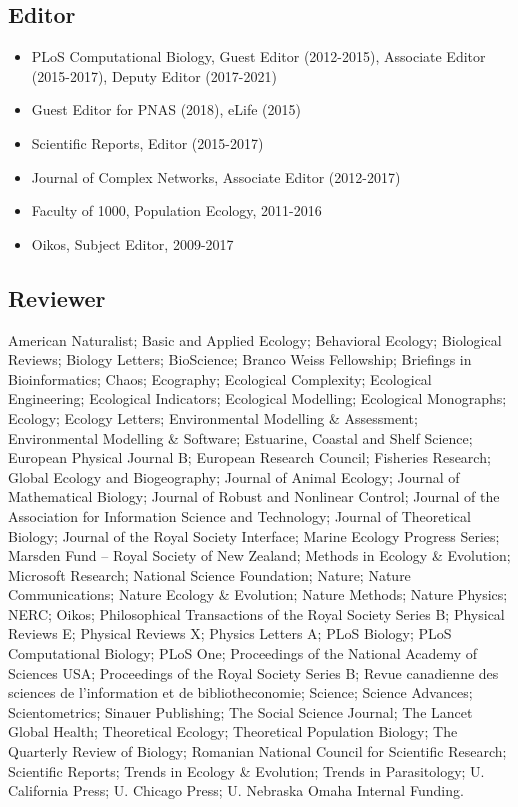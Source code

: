 \documentclass[10,letter,]{awesome-cv}
\providecommand{\tightlist}{%
	\setlength{\itemsep}{0pt}\setlength{\parskip}{0pt}}
\begin{document}
\hypertarget{editor}{%
\subsection{Editor}\label{editor}}

\begin{itemize}
\tightlist
\item
  PLoS Computational Biology, Guest Editor (2012-2015), Associate Editor
  (2015-2017), Deputy Editor (2017-2021)
\item
  Guest Editor for PNAS (2018), eLife (2015)
\item
  Scientific Reports, Editor (2015-2017)
\item
  Journal of Complex Networks, Associate Editor (2012-2017)
\item
  Faculty of 1000, Population Ecology, 2011-2016
\item
  Oikos, Subject Editor, 2009-2017
\end{itemize}

\hypertarget{reviewer}{%
\subsection{Reviewer}\label{reviewer}}

American Naturalist; Basic and Applied Ecology; Behavioral Ecology;
Biological Reviews; Biology Letters; BioScience; Branco Weiss
Fellowship; Briefings in Bioinformatics; Chaos; Ecography; Ecological
Complexity; Ecological Engineering; Ecological Indicators; Ecological
Modelling; Ecological Monographs; Ecology; Ecology Letters;
Environmental Modelling \& Assessment; Environmental Modelling \&
Software; Estuarine, Coastal and Shelf Science; European Physical
Journal B; European Research Council; Fisheries Research; Global Ecology
and Biogeography; Journal of Animal Ecology; Journal of Mathematical
Biology; Journal of Robust and Nonlinear Control; Journal of the
Association for Information Science and Technology; Journal of
Theoretical Biology; Journal of the Royal Society Interface; Marine
Ecology Progress Series; Marsden Fund -- Royal Society of New Zealand;
Methods in Ecology \& Evolution; Microsoft Research; National Science
Foundation; Nature; Nature Communications; Nature Ecology \& Evolution;
Nature Methods; Nature Physics; NERC; Oikos; Philosophical Transactions
of the Royal Society Series B; Physical Reviews E; Physical Reviews X;
Physics Letters A; PLoS Biology; PLoS Computational Biology; PLoS One;
Proceedings of the National Academy of Sciences USA; Proceedings of the
Royal Society Series B; Revue canadienne des sciences de l'information
et de bibliotheconomie; Science; Science Advances; Scientometrics;
Sinauer Publishing; The Social Science Journal; The Lancet Global
Health; Theoretical Ecology; Theoretical Population Biology; The
Quarterly Review of Biology; Romanian National Council for Scientific
Research; Scientific Reports; Trends in Ecology \& Evolution; Trends in
Parasitology; U. California Press; U. Chicago Press; U. Nebraska Omaha
Internal Funding.
\end{document}

